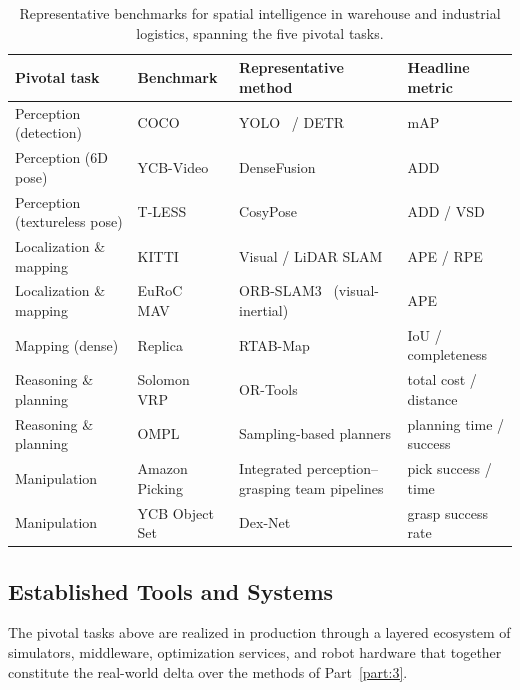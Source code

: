 \begin{table}[!th]
\centering
\fontsize{8}{10}\selectfont
\setlength{\tabcolsep}{1.0mm}
\caption{Representative benchmarks for spatial intelligence in warehouse and industrial logistics, spanning the five pivotal tasks.}
\label{tab:p4_s9_5_benchmarks}
\begin{tabular}{L{0.21\textwidth} L{0.21\textwidth} L{0.31\textwidth} L{0.18\textwidth}}
\toprule
\textbf{Pivotal task} & \textbf{Benchmark} & \textbf{Representative method} & \textbf{Headline metric} \\
\midrule
Perception (detection) & COCO~\cite{lin2014microsoft} & YOLO~\cite{redmon2016yolo} / DETR~\cite{Zhu2021DeformableDETR} & mAP \\
Perception (6D pose) & YCB-Video~\cite{xiang2017posecnn} & DenseFusion~\cite{Wang2019DenseFusion} & ADD \\
Perception (textureless pose) & T-LESS~\cite{Hodan2017TLESS} & CosyPose~\cite{Labbe2020CosyPose} & ADD / VSD \\
Localization \& mapping & KITTI~\cite{Geiger2013KITTI} & Visual / LiDAR SLAM & APE / RPE \\
Localization \& mapping & EuRoC MAV~\cite{Burri2016EuRoC} & ORB-SLAM3~\cite{Campos2021ORBSLAM3} (visual-inertial) & APE \\
Mapping (dense) & Replica~\cite{straub2019replica} & RTAB-Map~\cite{Labbe2019RTABMap} & IoU / completeness \\
Reasoning \& planning & Solomon VRP~\cite{Solomon1987VRP} & OR-Tools~\cite{Perron2019ORTools} & total cost / distance \\
Reasoning \& planning & OMPL~\cite{Sucan2012OMPL} & Sampling-based planners & planning time / success \\
Manipulation & Amazon Picking~\cite{Correll2016AmazonChallenge} & Integrated perception--grasping team pipelines & pick success / time \\
Manipulation & YCB Object Set~\cite{Calli2015YCB} & Dex-Net~\cite{Mahler2017DexNet} & grasp success rate \\
\bottomrule
\end{tabular}
\end{table}

\subsection{Established Tools and Systems}
\label{subsec:p4-sec9-5-established-tools-and-systems}
The pivotal tasks above are realized in production through a layered ecosystem of simulators, middleware, optimization services, and robot hardware that together constitute the real-world delta over the methods of Part~\ref{part:3}.

